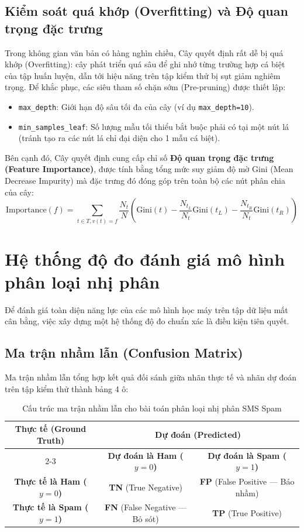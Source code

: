 \subsection{Kiểm soát quá khớp (Overfitting) và Độ quan trọng đặc trưng}
Trong không gian văn bản có hàng nghìn chiều, Cây quyết định rất dễ bị quá khớp (Overfitting): cây phát triển quá sâu để ghi nhớ từng trường hợp cá biệt của tập huấn luyện, dẫn tới hiệu năng trên tập kiểm thử bị sụt giảm nghiêm trọng.
Để khắc phục, các siêu tham số chặn sớm (Pre-pruning) được thiết lập:
\begin{itemize}
    \item \texttt{max\_depth}: Giới hạn độ sâu tối đa của cây (ví dụ \texttt{max\_depth=10}).
    \item \texttt{min\_samples\_leaf}: Số lượng mẫu tối thiểu bắt buộc phải có tại một nút lá (tránh tạo ra các nút lá chỉ đại diện cho 1 mẫu cá biệt).
\end{itemize}

Bên cạnh đó, Cây quyết định cung cấp chỉ số \textbf{Độ quan trọng đặc trưng (Feature Importance)}, được tính bằng tổng mức suy giảm độ mờ Gini (Mean Decrease Impurity) mà đặc trưng đó đóng góp trên toàn bộ các nút phân chia của cây:
\begin{equation}
\text{Importance}(f) = \sum_{t \in T, v(t)=f} \frac{N_t}{N} \left( \text{Gini}(t) - \frac{N_{t_L}}{N_t} \text{Gini}(t_L) - \frac{N_{t_R}}{N_t} \text{Gini}(t_R) \right)
\end{equation}

\section{Hệ thống độ đo đánh giá mô hình phân loại nhị phân}
\label{sec:do-do-ly-thuyet}

Để đánh giá toàn diện năng lực của các mô hình học máy trên tập dữ liệu mất cân bằng, việc xây dựng một hệ thống độ đo chuẩn xác là điều kiện tiên quyết.

\subsection{Ma trận nhầm lẫn (Confusion Matrix)}
Ma trận nhầm lẫn tổng hợp kết quả đối sánh giữa nhãn thực tế và nhãn dự đoán trên tập kiểm thử thành bảng 4 ô:
\begin{table}[H]
\centering
\caption{Cấu trúc ma trận nhầm lẫn cho bài toán phân loại nhị phân SMS Spam}
\label{tab:ly-thuyet-cm}
\begin{tabular}{|c|c|c|}
\hline
\multirow{2}{*}{\textbf{Thực tế (Ground Truth)}} & \multicolumn{2}{c|}{\textbf{Dự đoán (Predicted)}} \\
\cline{2-3}
& \textbf{Dự đoán là Ham ($y=0$)} & \textbf{Dự đoán là Spam ($y=1$)} \\
\hline
\textbf{Thực tế là Ham ($y=0$)} & \textbf{TN} (True Negative) & \textbf{FP} (False Positive --- Báo nhầm) \\
\hline
\textbf{Thực tế là Spam ($y=1$)} & \textbf{FN} (False Negative --- Bỏ sót) & \textbf{TP} (True Positive) \\
\hline
\end{tabular}
\end{table}

